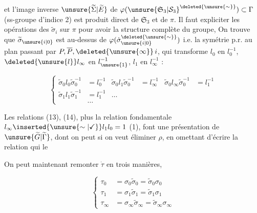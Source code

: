 et l'image inverse $\unsure{\widetilde\Sigma|\widetilde E}$ de $\varphi({\unsure{\mathfrak S_3|\mathcal S_3}}^{\deleted{\unsure{\sim}}})\subset\Gamma$ (ss-groupe d'indice 2) est produit  direct de $\mathfrak S_3$ et de $\pi$. Il faut expliciter les opérations des $\widetilde\sigma_i$ sur $\pi$ pour avoir la structure complète du groupe, On trouve que $\widetilde\sigma_{\unsure{i|0}}$ est au-dessus de $\varphi(\dot\sigma_{\unsure{i|0}}^{\deleted{\unsure{\sim}}})$ i.e. la symétrie p.r. au plan passant par $P,\overline P,\deleted{\unsure{\infty}}\,i$, qui transforme $l_0$ en $l_0^{-1}$, $\deleted{\unsure{l}}l_\infty$ en $l_{\unsure{1}}^{-1}$, $l_1$ en $l_\infty^{-1}$ :



\[
\left\{\begin{aligned}
\widetilde\sigma_0 l_0\widetilde\sigma_0^{-1}&=l_0^{-1}&
\widetilde\sigma_0 l_1\widetilde\sigma_0^{-1}&=l_\infty^{-1}&
\widetilde\sigma_0 l_\infty\widetilde\sigma_0^{-1}&=l_1^{-1}\\
\widetilde\sigma_1 l_1\widetilde\sigma_1^{-1}&=l_1^{-1}&\ldots\\
&\ldots
\end{aligned}\right. \tag*{(14)}
\]

Les relations (13), (14), plus la relation fondamentale $l_\infty\inserted{\unsure{\sim|\checkmark}}l_1l_0=1$ (1), font une présentation de $\unsure{\widetilde G|\widetilde\Gamma}$, dont on peut si on veut éliminer $\rho$, en omettant d'écrire la relation qui le 

On peut maintenant remonter $\dot\tau$ en trois manières,  

\[
\left\{\begin{aligned}
\tau_0&=\sigma_0\widetilde\sigma_0=\widetilde\sigma_0\sigma_0\\
\tau_1&=\sigma_1\widetilde\sigma_1=\widetilde\sigma_1\sigma_1\\
\tau_\infty&=\sigma_\infty\widetilde\sigma_\infty=\widetilde\sigma_\infty\sigma_\infty
\end{aligned}\right. \tag*{(15)}
\]

